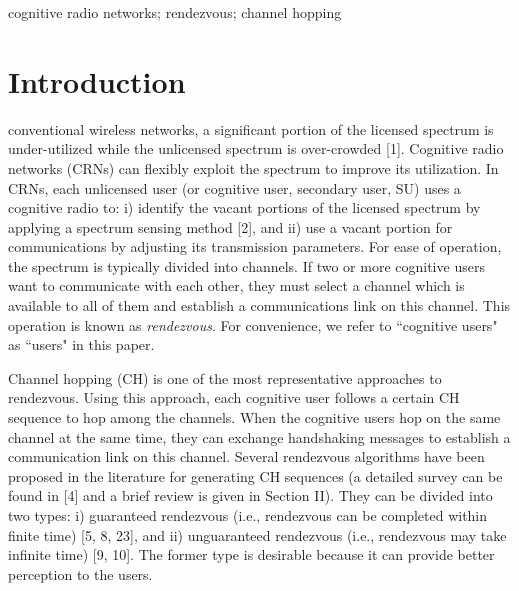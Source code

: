 \documentclass[journal]{IEEEtran}
\begin{document}
\begin{IEEEkeywords}
cognitive radio networks; rendezvous; channel hopping
\end{IEEEkeywords}



\section{Introduction}
 conventional wireless networks, a significant portion of the licensed spectrum is under-utilized while the unlicensed spectrum is over-crowded [1]. Cognitive radio networks (CRNs) can flexibly exploit the spectrum to improve its utilization. In CRNs, each unlicensed user (or cognitive user, secondary user, SU) uses a cognitive radio to: i) identify the vacant portions of the licensed spectrum by applying a spectrum sensing method [2], and ii) use a vacant portion for communications by adjusting its transmission parameters. For ease of operation, the spectrum is typically divided into channels. If two or more cognitive users want to communicate with each other, they must select a channel which is available to all of them and establish a communications link on this channel. This operation is known as \emph{rendezvous}. For convenience, we refer to ``cognitive users" as ``users" in this paper.
\par Channel hopping (CH) is one of the most representative approaches to rendezvous. Using this approach, each cognitive user follows a certain CH sequence to hop among the channels. When the cognitive users hop on the same channel at the same time, they can exchange handshaking messages to establish a communication link on this channel. Several rendezvous algorithms have been proposed in the literature for generating CH sequences (a detailed survey can be found in [4] and a brief review is given in Section II). They can be divided into two types: i) guaranteed rendezvous (i.e., rendezvous can be completed within finite time) [5, 8, 23], and ii) unguaranteed rendezvous (i.e., rendezvous may take infinite time) [9, 10]. The former type is desirable because it can provide better perception to the users.
\end{document}
